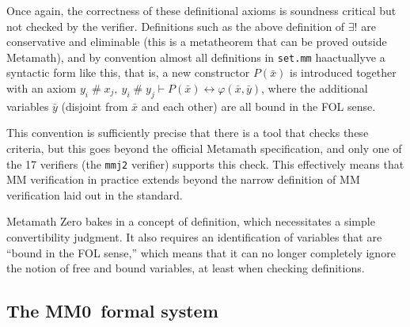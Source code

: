 \documentclass[runningheads]{llncs}
\newcommand{\mmO}{\textsf{MM0}}
\newcommand{\fresh}{\mathrel{\#}}
\begin{document}
Once again, the correctness of these definitional axioms is soundness critical but not checked by the verifier. Definitions such as the above definition of $\exists!$ are conservative and eliminable (this is a metatheorem that can be proved outside Metamath), and by convention almost all definitions in \texttt{set.mm} haactuallyve a syntactic form like this, that is, a new constructor $P(\bar x)$ is introduced together with an axiom $y_i\fresh x_j,\ y_i\fresh y_j\vdash P(\bar x)\leftrightarrow\varphi(\bar x,\bar y)$, where the additional variables $\bar y$ (disjoint from $\bar x$ and each other) are all bound in the FOL sense.

This convention is sufficiently precise that there is a tool that checks these criteria, but this goes beyond the official Metamath specification, and only one of the 17 verifiers (the \texttt{mmj2} verifier) supports this check. This effectively means that MM verification in practice extends beyond the narrow definition of MM verification laid out in the standard.

Metamath Zero bakes in a concept of definition, which necessitates a simple convertibility judgment. It also requires an identification of variables that are ``bound in the FOL sense,'' which means that it can no longer completely ignore the notion of free and bound variables, at least when checking definitions.

\subsection{The \mmO\ formal system}\label{sec:formal}
\end{document}
